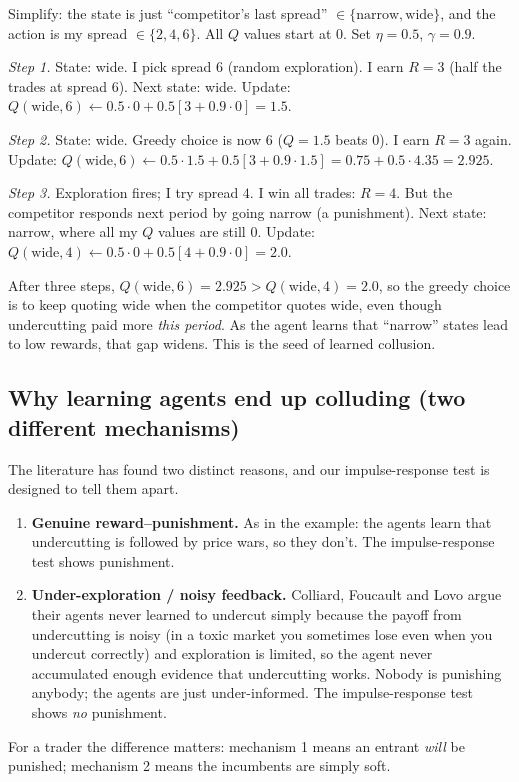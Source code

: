 \documentclass[11pt]{article}
\begin{document}
\begin{example}
Simplify: the state is just ``competitor's last spread'' $\in\{\text{narrow},\text{wide}\}$, and the action is my spread $\in\{2,4,6\}$. All $Q$ values start at $0$. Set $\eta=0.5$, $\gamma=0.9$.

\emph{Step 1.} State: wide. I pick spread $6$ (random exploration). I earn $R=3$ (half the trades at spread $6$). Next state: wide. Update:
$Q(\text{wide},6)\leftarrow 0.5\cdot0+0.5[3+0.9\cdot0]=1.5$.

\emph{Step 2.} State: wide. Greedy choice is now $6$ ($Q=1.5$ beats $0$). I earn $R=3$ again. Update:
$Q(\text{wide},6)\leftarrow 0.5\cdot1.5+0.5[3+0.9\cdot1.5]=0.75+0.5\cdot4.35=2.925$.

\emph{Step 3.} Exploration fires; I try spread $4$. I win all trades: $R=4$. But the competitor responds next period by going narrow (a punishment). Next state: narrow, where all my $Q$ values are still $0$. Update:
$Q(\text{wide},4)\leftarrow 0.5\cdot0+0.5[4+0.9\cdot0]=2.0$.

After three steps, $Q(\text{wide},6)=2.925>Q(\text{wide},4)=2.0$, so the greedy choice is to keep quoting wide when the competitor quotes wide, even though undercutting paid more \emph{this period}. As the agent learns that ``narrow'' states lead to low rewards, that gap widens. This is the seed of learned collusion.
\end{example}

\subsection{Why learning agents end up colluding (two different mechanisms)}\label{sec:whycollude}
The literature has found two distinct reasons, and our impulse-response test is designed to tell them apart.
\begin{enumerate}
\item \textbf{Genuine reward--punishment.} As in the example: the agents learn that undercutting is followed by price wars, so they don't. The impulse-response test shows punishment.
\item \textbf{Under-exploration / noisy feedback.} Colliard, Foucault and Lovo argue their agents never learned to undercut simply because the payoff from undercutting is noisy (in a toxic market you sometimes lose even when you undercut correctly) and exploration is limited, so the agent never accumulated enough evidence that undercutting works. Nobody is punishing anybody; the agents are just under-informed. The impulse-response test shows \emph{no} punishment.
\end{enumerate}
For a trader the difference matters: mechanism 1 means an entrant \emph{will} be punished; mechanism 2 means the incumbents are simply soft.
\end{document}

